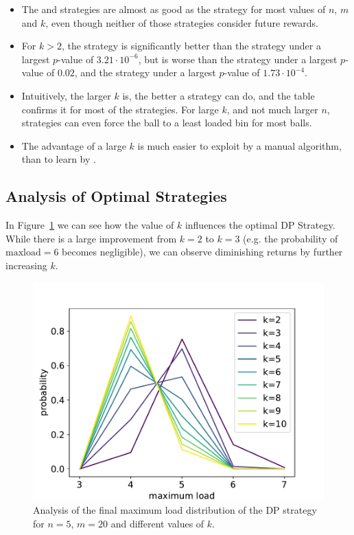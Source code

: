 \begin{itemize}
    \item
    The \Quantile and \LocalRewardOptimiser strategies are almost as good as the \DP strategy for most values of $n$, $m$ and $k$, even though neither of those strategies consider future rewards.
    \item
    For $k>2$, the \DQN strategy is significantly better than the \Threshold strategy under a largest $p$-value of $3.21\cdot 10^{-6}$, but is worse than the \Quantile strategy under a largest $p$-value of $0.02$, and the \LocalRewardOptimiser strategy under a largest $p$-value of $1.73\cdot 10^{-4}$.
    \item
    Intuitively, the larger $k$ is, the better a strategy can do, and the table confirms it for most of the strategies. For large $k$, and not much larger $n$, strategies can even force the ball to a least loaded bin for most balls.
    \item
    The advantage of a large $k$ is much easier to exploit by a manual algorithm, than to learn by \DQL.
\end{itemize}


\subsection{Analysis of Optimal Strategies}


In Figure~\ref{k-thinning-dp-maxload} we can see how the value of $k$ influences the optimal DP Strategy. While there is a large improvement from $k=2$ to $k=3$ (e.g. the probability of $\mathrm{maxload}=6$ becomes negligible), we can observe diminishing returns by further increasing $k$.


\begin{figure}[ht]
    \centering
    \includegraphics[scale=0.6]{Chapter4/Figs/k_thinning_max_load_distribution_5_20.pdf}
    \caption{Analysis of the final maximum load distribution of the DP strategy for $n=5$, $m=20$ and different values of $k$.}
    \label{k-thinning-dp-maxload}
\end{figure}

